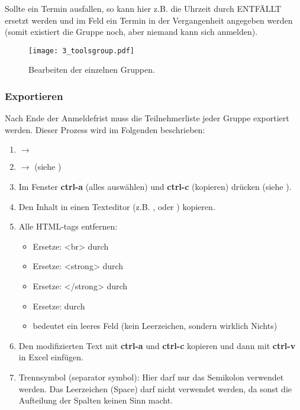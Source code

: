 Sollte ein Termin ausfallen, so kann hier z.B. die Uhrzeit durch 
\glqq{}ENTFÄLLT\grqq{} ersetzt werden und im Feld 
ein Termin in der Vergangenheit angegeben werden (somit existiert die Gruppe
noch, aber niemand kann sich anmelden).

\begin{figure}[htbp]
  \texttt{[image: 3\_toolsgroup.pdf]}
  \caption{ Bearbeiten der einzelnen Gruppen.}
  \label{fig:toolsgroup}
\end{figure}

\newpage
\subsubsection{Exportieren}

Nach Ende der Anmeldefrist muss die Teilnehmerliste jeder Gruppe exportiert
werden. Dieser Prozess wird im Folgenden beschrieben:
\begin{enumerate}
  \item {} $\to$  
  \item {} $\to$  (siehe )
  \item Im Fenster  {\bf ctrl-a} (alles auswählen) und 
    {\bf ctrl-c} (kopieren) drücken (siehe ).
 \item Den Inhalt in einen Texteditor (z.B. , 
    oder ) kopieren.
 \item Alle HTML-tags entfernen:
    \begin{itemize}
      \item Ersetze: <br> durch 
      \item Ersetze: <strong> durch 
      \item Ersetze: </strong> durch 
      \item Ersetze: \grqq{} durch  \footnotemark[2]
      \item {} bedeutet ein leeres Feld (kein Leerzeichen, sondern
        wirklich Nichts)
    \end{itemize}
  \item Den modifizierten Text mit {\bf ctrl-a} und {\bf ctrl-c} kopieren und
    dann mit {\bf ctrl-v} in Excel einfügen.
  \item Trennsymbol (\glqq{}separator symbol\grqq{}): Hier darf nur das
    Semikolon verwendet werden. Das Leerzeichen (Space) darf nicht verwendet
    werden, da sonst die Aufteilung der Spalten keinen Sinn macht.
\end{enumerate}

